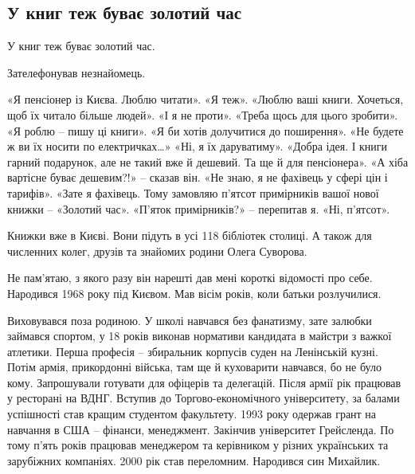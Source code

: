  
 
 

\subsection{У книг теж буває золотий час}


У книг теж буває золотий час.

Зателефонував незнайомець.

«Я пенсіонер із Києва. Люблю читати».
«Я теж».
«Люблю ваші книги. Хочеться, щоб їх читало більше людей».
«І я не проти».
«Треба щось для цього зробити».
«Я роблю – пишу ці книги».
«Я би хотів долучитися до поширення».
«Не будете ж ви їх носити по електричках…»
«Ні, я їх даруватиму».
«Добра ідея. І книги гарний подарунок, але не такий вже й дешевий. Та ще й для пенсіонера».
«А хіба вартісне буває дешевим?!» – сказав він.
«Не знаю, я не фахівець у сфері цін і тарифів».
«Зате я фахівець. Тому замовляю п’ятсот примірників вашої нової книжки – «Золотий час».
«П’яток примірників?» – перепитав я.
«Ні, п’ятсот».

Книжки вже в Києві. Вони підуть в усі 118 бібліотек столиці. А також для
численних колег, друзів та знайомих родини Олега Суворова.

Не пам’ятаю, з якого разу він нарешті дав мені короткі відомості про себе.
Народився 1968 року під Києвом. Мав вісім років, коли батьки розлучилися.

Виховувався поза родиною. У школі навчався без фанатизму, зате залюбки займався
спортом, у 18 років виконав нормативи кандидата в майстри з важкої атлетики.
Перша професія – збиральник корпусів суден на Ленінській кузні.  Потім армія,
прикордонні війська, там ще й куховарити навчався, бо не було кому. Запрошували
готувати для офіцерів та делегацій. Після армії рік працював у ресторані на
ВДНГ. Вступив до Торгово-економічного університету, за балами успішності став
кращим студентом факультету. 1993 року одержав грант на навчання в США –
фінанси, менеджмент. Закінчив університет Грейсленда. По тому п’ять років
працював менеджером та керівником у різних українських та зарубіжних компаніях.
2000 рік став переломним. Народився син Михайлик.

